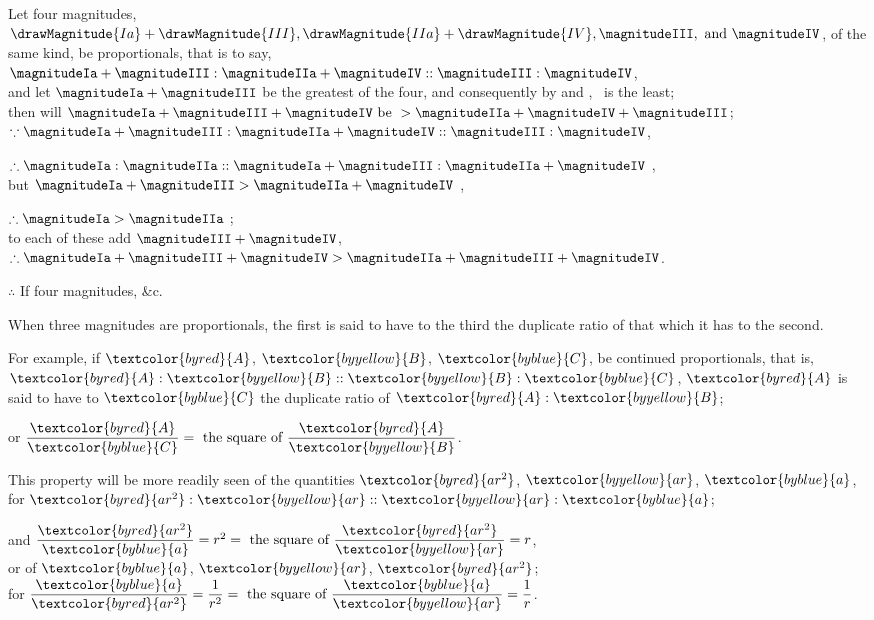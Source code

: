 \begin{center}
Let four magnitudes, $\drawMagnitude{Ia} + \drawMagnitude{III}, \drawMagnitude{IIa} + \drawMagnitude{IV}, \magnitudeIII, \mbox{ and } \magnitudeIV$, of the same kind, be proportionals, that is to say,\\
$\magnitudeIa + \magnitudeIII : \magnitudeIIa + \magnitudeIV :: \magnitudeIII : \magnitudeIV$,\\
and let $\magnitudeIa + \magnitudeIII$ be the greatest of the four, and consequently by  and , \magnitudeIV\ is the least;\\
then will $\magnitudeIa + \magnitudeIII + \magnitudeIV \mbox{ be } > \magnitudeIIa + \magnitudeIV + \magnitudeIII$;\\
$\because \magnitudeIa + \magnitudeIII : \magnitudeIIa + \magnitudeIV :: \magnitudeIII : \magnitudeIV$, %

$\therefore \magnitudeIa : \magnitudeIIa :: \magnitudeIa + \magnitudeIII : \magnitudeIIa + \magnitudeIV$ ,\\
but $\magnitudeIa + \magnitudeIII > \magnitudeIIa + \magnitudeIV$ \bycref{\hypref},

$\therefore \magnitudeIa > \magnitudeIIa$ ;\\
to each of these add $\magnitudeIII + \magnitudeIV$,\\
$\therefore \magnitudeIa + \magnitudeIII + \magnitudeIV > \magnitudeIIa + \magnitudeIII + \magnitudeIV$.

$\therefore$ If four magnitudes, \&c.
\end{center}


\vfill\pagebreak

\label{def:V.X} 
\def\varA{\textcolor{byred}{A}}
\def\varB{\textcolor{byyellow}{B}}
\def\varC{\textcolor{byblue}{C}}
\def\vararS{\textcolor{byred}{ar^2}}
\def\varar{\textcolor{byyellow}{ar}}
\def\vara{\textcolor{byblue}{a}}
When three magnitudes are proportionals, the first is said to have to the third the duplicate ratio of that which it has to the second.

For example, if $\varA$, $\varB$, $\varC$, be continued proportionals, that is, $\varA : \varB :: \varB : \varC$, $\varA$ is said to have to $\varC$ the duplicate ratio of $\varA : \varB$;

\begin{center}
or $\dfrac{\varA}{\varC} = \mbox{ the square of } \dfrac{\varA}{\varB}$.

This property will be more readily seen of the quantities $\vararS$, $\varar$, $\vara$, for $\vararS : \varar :: \varar : \vara$;

and $\dfrac{\vararS}{\vara} = r^2 = \mbox{ the square of } \dfrac{\vararS}{\varar} = r$,\\
or of $\vara$, $\varar$, $\vararS$;\\
for $\dfrac{\vara}{\vararS} = \dfrac{1}{r^2} = \mbox{ the square of } \dfrac{\vara}{\varar} = \dfrac{1}{r}$.
\end{center}

